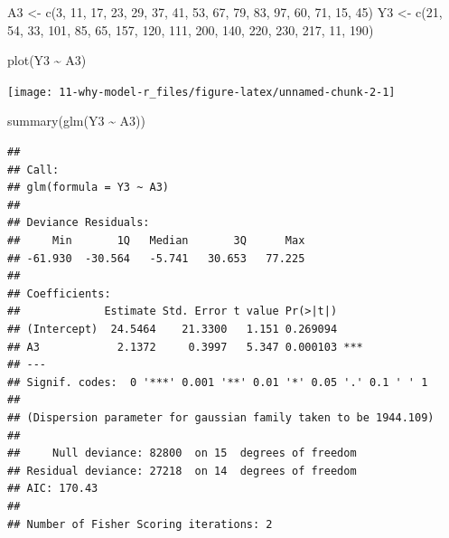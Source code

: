 \documentclass[
  10pt,
]{book}
\newenvironment{Shaded}{\begin{snugshade}}{\end{snugshade}}
\newcommand{\DecValTok}[1]{\textcolor[rgb]{0.00,0.00,0.81}{#1}}
\newcommand{\FunctionTok}[1]{\textcolor[rgb]{0.00,0.00,0.00}{#1}}
\newcommand{\NormalTok}[1]{#1}
\newcommand{\OtherTok}[1]{\textcolor[rgb]{0.56,0.35,0.01}{#1}}
\newcommand{\SpecialCharTok}[1]{\textcolor[rgb]{0.00,0.00,0.00}{#1}}
\begin{document}
\begin{Shaded}
\begin{Highlighting}[]
\NormalTok{A3 }\OtherTok{\textless{}{-}}
  \FunctionTok{c}\NormalTok{(}\DecValTok{3}\NormalTok{, }\DecValTok{11}\NormalTok{, }\DecValTok{17}\NormalTok{, }\DecValTok{23}\NormalTok{, }\DecValTok{29}\NormalTok{, }\DecValTok{37}\NormalTok{, }\DecValTok{41}\NormalTok{, }\DecValTok{53}\NormalTok{, }\DecValTok{67}\NormalTok{, }\DecValTok{79}\NormalTok{, }\DecValTok{83}\NormalTok{, }\DecValTok{97}\NormalTok{, }\DecValTok{60}\NormalTok{, }\DecValTok{71}\NormalTok{, }\DecValTok{15}\NormalTok{, }\DecValTok{45}\NormalTok{)}
\NormalTok{Y3 }\OtherTok{\textless{}{-}}
  \FunctionTok{c}\NormalTok{(}\DecValTok{21}\NormalTok{, }\DecValTok{54}\NormalTok{, }\DecValTok{33}\NormalTok{, }\DecValTok{101}\NormalTok{, }\DecValTok{85}\NormalTok{, }\DecValTok{65}\NormalTok{, }\DecValTok{157}\NormalTok{, }\DecValTok{120}\NormalTok{, }\DecValTok{111}\NormalTok{, }\DecValTok{200}\NormalTok{, }\DecValTok{140}\NormalTok{, }\DecValTok{220}\NormalTok{, }\DecValTok{230}\NormalTok{, }\DecValTok{217}\NormalTok{,}
    \DecValTok{11}\NormalTok{, }\DecValTok{190}\NormalTok{)}

\FunctionTok{plot}\NormalTok{(Y3 }\SpecialCharTok{\textasciitilde{}}\NormalTok{ A3)}
\end{Highlighting}
\end{Shaded}

\begin{center}\texttt{[image: 11-why-model-r\_files/figure-latex/unnamed-chunk-2-1]} \end{center}

\begin{Shaded}
\begin{Highlighting}[]
\FunctionTok{summary}\NormalTok{(}\FunctionTok{glm}\NormalTok{(Y3 }\SpecialCharTok{\textasciitilde{}}\NormalTok{ A3))}
\end{Highlighting}
\end{Shaded}

\begin{verbatim}
## 
## Call:
## glm(formula = Y3 ~ A3)
## 
## Deviance Residuals: 
##     Min       1Q   Median       3Q      Max  
## -61.930  -30.564   -5.741   30.653   77.225  
## 
## Coefficients:
##             Estimate Std. Error t value Pr(>|t|)    
## (Intercept)  24.5464    21.3300   1.151 0.269094    
## A3            2.1372     0.3997   5.347 0.000103 ***
## ---
## Signif. codes:  0 '***' 0.001 '**' 0.01 '*' 0.05 '.' 0.1 ' ' 1
## 
## (Dispersion parameter for gaussian family taken to be 1944.109)
## 
##     Null deviance: 82800  on 15  degrees of freedom
## Residual deviance: 27218  on 14  degrees of freedom
## AIC: 170.43
## 
## Number of Fisher Scoring iterations: 2
\end{verbatim}
\end{document}
